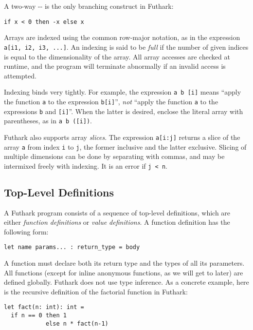 \documentclass[oneside,11pt]{book}
\begin{document}
A two-way -- is the only branching construct in
Futhark:

\begin{lstlisting}
if x < 0 then -x else x
\end{lstlisting}

Arrays are indexed using the common row-major notation, as in the expression
\texttt{a[i1, i2, i3, ...]}.  An indexing is said to be \textit{full} if
the number of given indices is equal to the dimensionality of the
array.  All array accesses are checked at runtime, and the program
will terminate abnormally if an invalid access is attempted.

Indexing binds very tightly.  For example, the expression
\texttt{a~b~[i]} means ``apply the function \texttt{a} to the
expression \texttt{b[i]}'', \textit{not} ``apply the function
\texttt{a} to the expressions \texttt{b} and \texttt{[i]}''.  When the
latter is desired, enclose the literal array with parentheses, as in
\texttt{a~b~([i])}.

Futhark also supports array \textit{slices}.  The expression
\texttt{a[i:j]} returns a slice of the array \texttt{a} from index
\texttt{i} to \texttt{j}, the former inclusive and the latter
exclusive.  Slicing of multiple dimensions can be done by separating
with commas, and may be intermixed freely with indexing.  It is an
error if \texttt{j < n}.

\subsection{Top-Level Definitions}
\label{sec:function-declarations}

A Futhark program consists of a sequence of top-level definitions,
which are either \textit{function definitions} or \textit{value
  definitions}.  A function definition has the following form:

\begin{lstlisting}
let name params... : return_type = body
\end{lstlisting}

\noindent
A function must declare both its return type and the types of all its
parameters.  All functions (except for inline anonymous functions, as
we will get to later) are defined globally.  Futhark does not use type
inference.  As a concrete example, here is the recursive definition of
the factorial function in Futhark:

\begin{lstlisting}
let fact(n: int): int =
  if n == 0 then 1
            else n * fact(n-1)
\end{lstlisting}
\end{document}
